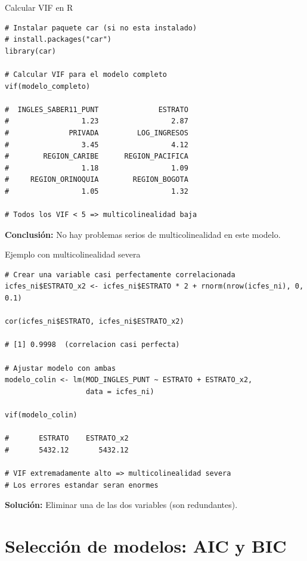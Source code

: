 \documentclass[aspectratio=169, 11pt]{beamer}
\begin{document}
\begin{frame}[fragile]{Calcular VIF en R}
\begin{lstlisting}
# Instalar paquete car (si no esta instalado)
# install.packages("car")
library(car)

# Calcular VIF para el modelo completo
vif(modelo_completo)

#  INGLES_SABER11_PUNT              ESTRATO
#                 1.23                 2.87
#              PRIVADA         LOG_INGRESOS
#                 3.45                 4.12
#        REGION_CARIBE      REGION_PACIFICA
#                 1.18                 1.09
#     REGION_ORINOQUIA        REGION_BOGOTA
#                 1.05                 1.32

# Todos los VIF < 5 => multicolinealidad baja
\end{lstlisting}

\vspace{0.1cm}
{\small \textbf{Conclusi\'on:} No hay problemas serios de multicolinealidad en este modelo.}
\end{frame}

\begin{frame}[fragile]{Ejemplo con multicolinealidad severa}
\begin{lstlisting}[basicstyle=\ttfamily\scriptsize]
# Crear una variable casi perfectamente correlacionada
icfes_ni$ESTRATO_x2 <- icfes_ni$ESTRATO * 2 + rnorm(nrow(icfes_ni), 0, 0.1)

cor(icfes_ni$ESTRATO, icfes_ni$ESTRATO_x2)

# [1] 0.9998  (correlacion casi perfecta)

# Ajustar modelo con ambas
modelo_colin <- lm(MOD_INGLES_PUNT ~ ESTRATO + ESTRATO_x2,
                   data = icfes_ni)

vif(modelo_colin)

#       ESTRATO    ESTRATO_x2
#       5432.12       5432.12

# VIF extremadamente alto => multicolinealidad severa
# Los errores estandar seran enormes
\end{lstlisting}

\vspace{0.1cm}
{\small \textbf{Soluci\'on:} Eliminar una de las dos variables (son redundantes).}
\end{frame}

\section{Selección de modelos: AIC y BIC}
\end{document}
